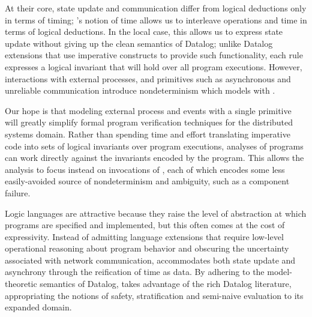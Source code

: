 
At their core, state update and communication differ from logical
deductions only in terms of timing; \lang's notion of time allows us
to interleave operations and time in terms of logical deductions.
In the local case, this allows us to express state update without giving up the clean semantics of Datalog; unlike
Datalog extensions that use imperative constructs to provide such
functionality, each \lang rule expresses a logical invariant that will
hold over all program executions.  
However, interactions with external processes, and primitives such as
asynchronous and unreliable communication introduce nondeterminism
which \lang models with .  

Our hope is that modeling external process and events with a single
primitive will greatly simplify formal program verification techniques for the distributed systems domain.  Rather
than spending time and effort translating imperative code into sets of logical
invariants over program executions, analyses of \lang programs can
work directly against the invariants encoded by the program.  This  allows
the analysis to focus instead on invocations of , each of which
encodes some less easily-avoided source of nondeterminism and
ambiguity, such as a component failure.

Logic languages are attractive because they raise the level of abstraction at which programs are specified
and implemented, but this often comes at the cost of expressivity.  Instead of admitting language extensions that require low-level 
operational reasoning about program behavior and obscuring the uncertainty associated with network communication, \lang 
accommodates both state update and asynchrony through the reification of time as data.  By adhering to the model-theoretic
semantics of Datalog, \lang takes advantage of the rich Datalog literature, appropriating the notions of safety, stratification
and semi-naive evaluation to its expanded domain.  




